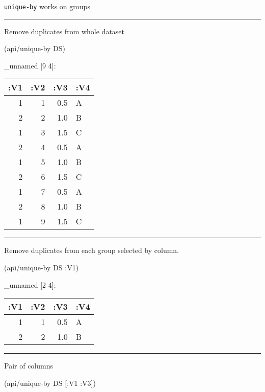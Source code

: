 \documentclass[]{article}
\newenvironment{Shaded}{\begin{snugshade}}{\end{snugshade}}
\newcommand{\AttributeTok}[1]{\textcolor[rgb]{0.77,0.63,0.00}{#1}}
\newcommand{\NormalTok}[1]{#1}
\begin{document}
\texttt{unique-by} works on groups

\begin{center}\rule{0.5\linewidth}{0.5pt}\end{center}

Remove duplicates from whole dataset

\begin{Shaded}
\begin{Highlighting}[]
\NormalTok{(api/unique-by DS)}
\end{Highlighting}
\end{Shaded}

\_unnamed {[}9 4{]}:

\begin{longtable}[]{@{}rrrl@{}}
\toprule
:V1 & :V2 & :V3 & :V4\tabularnewline
\midrule
\endhead
1 & 1 & 0.5 & A\tabularnewline
2 & 2 & 1.0 & B\tabularnewline
1 & 3 & 1.5 & C\tabularnewline
2 & 4 & 0.5 & A\tabularnewline
1 & 5 & 1.0 & B\tabularnewline
2 & 6 & 1.5 & C\tabularnewline
1 & 7 & 0.5 & A\tabularnewline
2 & 8 & 1.0 & B\tabularnewline
1 & 9 & 1.5 & C\tabularnewline
\bottomrule
\end{longtable}

\begin{center}\rule{0.5\linewidth}{0.5pt}\end{center}

Remove duplicates from each group selected by column.

\begin{Shaded}
\begin{Highlighting}[]
\NormalTok{(api/unique-by DS }\AttributeTok{:V1}\NormalTok{)}
\end{Highlighting}
\end{Shaded}

\_unnamed {[}2 4{]}:

\begin{longtable}[]{@{}rrrl@{}}
\toprule
:V1 & :V2 & :V3 & :V4\tabularnewline
\midrule
\endhead
1 & 1 & 0.5 & A\tabularnewline
2 & 2 & 1.0 & B\tabularnewline
\bottomrule
\end{longtable}

\begin{center}\rule{0.5\linewidth}{0.5pt}\end{center}

Pair of columns

\begin{Shaded}
\begin{Highlighting}[]
\NormalTok{(api/unique-by DS [}\AttributeTok{:V1} \AttributeTok{:V3}\NormalTok{])}
\end{Highlighting}
\end{Shaded}
\end{document}
